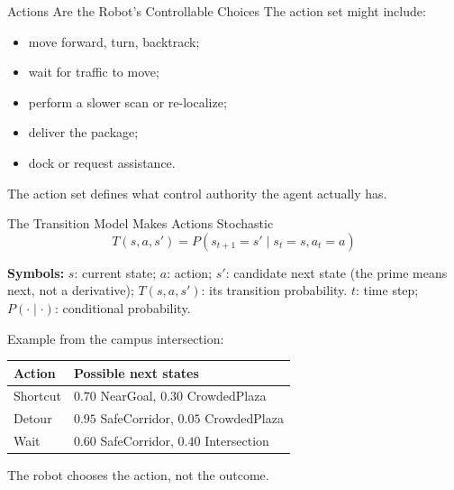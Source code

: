 \documentclass[aspectratio=169,10pt]{beamer}
\newcommand{\equationlegend}[1]{%
  \par\smallskip
  \begingroup
    \setlength{\fboxsep}{4pt}%
    \noindent\colorbox{DeckSoft}{%
      \parbox{\dimexpr\linewidth-2\fboxsep\relax}{%
        \footnotesize\textbf{Symbols:} #1%
      }%
    }\par
  \endgroup
  \smallskip
}
\begin{document}
\begin{frame}[shrink=10]{Actions Are the Robot's Controllable Choices}
  The action set might include:
  \begin{itemize}
    \item move forward, turn, backtrack;
    \item wait for traffic to move;
    \item perform a slower scan or re-localize;
    \item deliver the package;
    \item dock or request assistance.
  \end{itemize}

  \begin{keyidea}
    The action set defines what control authority the agent actually has.
  \end{keyidea}
\end{frame}

\begin{frame}[shrink=10]{The Transition Model Makes Actions Stochastic}
  \[
    T(s,a,s')=P(s_{t+1}=s'\mid s_t=s,a_t=a)
  \]
  \equationlegend{$s$: current state; $a$: action; $s'$: candidate next state (the prime means next, not a derivative); $T(s,a,s')$: its transition probability. $t$: time step; $P(\cdot\mid\cdot)$: conditional probability.}

  Example from the campus intersection:
  \begin{center}
    \renewcommand{\arraystretch}{1.3}
    \begin{tabular}{l|l}
      \textbf{Action} & \textbf{Possible next states} \\\hline
      Shortcut & $0.70$ NearGoal, $0.30$ CrowdedPlaza \\
      Detour & $0.95$ SafeCorridor, $0.05$ CrowdedPlaza \\
      Wait & $0.60$ SafeCorridor, $0.40$ Intersection \\
    \end{tabular}
  \end{center}

  \begin{keyidea}
    The robot chooses the action, not the outcome.
  \end{keyidea}
\end{frame}
\end{document}
